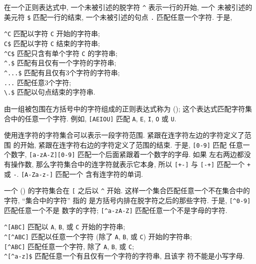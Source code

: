在一个正则表达式中, 一个未被引述的脱字符 \verb'^' 表示一行的开始, 一个
未被引述的美元符 \verb'$' 匹配一行的结束, 一个未被引述的句点 \verb'.'
匹配任意一个字符. 于是,
\begin{tabbing}
    \verb'^C' \hspace{4em}  \= 匹配以字符 \verb'C' 开始的字符串; \\
    \verb'C$'   \> 匹配以字符 \verb'C' 结束的字符串; \\
    \verb'^C$'  \> 匹配只含有单个字符 \verb'C' 的字符串; \\
    \verb'^.$'  \> 匹配有且仅有一个字符的字符串; \\
    \verb'^...$' \> 匹配有且仅有3个字符的字符串; \\
    \verb'...'  \> 匹配任意3个字符; \\
    \verb'\.$'  \> 匹配以句点结束的字符串.
\end{tabbing}

由一组被包围在方括号中的字符组成的正则表达式称为 
(); 这个表达式匹配字符集合中的任意一个字符. 例如,
\verb'[AEIOU]' 匹配 \verb'A', \verb'E', \verb'I', \verb'O' 或 \verb'U'.

使用连字符的字符集合可以表示一段字符范围. 紧跟在连字符左边的字符定义了范围
的开始, 紧跟在连字符右边的字符定义了范围的结束. 于是, \verb'[0-9]' 匹配
任意一个数字, \verb'[a-zA-Z][0-9]' 匹配一个后面紧跟着一个数字的字母. 如果
左右两边都没有操作数, 那么字符集合中的连字符就表示它本身, 所以 \verb'[+-]'
与 \verb'[-+]' 匹配一个 \verb'+' 或 \verb'-'. \verb'[A-Za-z-]' 匹配一个
含有连字符的单词.

一个  () 的字符集合在 \verb'[' 之后以
\verb'^' 开始. 这样一个集合匹配任意一个不在集合中的字符, ``集合中的字符''%
指的
是方括号内排在脱字符之后的那些字符. 于是, \verb'[^0-9]' 匹配任意一个不是
数字的字符; \verb'[^a-zA-Z]' 匹配任意一个不是字母的字符.
\begin{tabbing}
    \verb'^[ABC]' \hspace{4em}  \= 匹配以 \verb'A', \verb'B', 或 \verb'C'
        开始的字符串; \\
    \verb'^[^ABC]' \> 匹配以任意一个字符 (除了 \verb'A', \verb'B',
        或 \verb'C') 开始的字符串; \\
    \verb'[^ABC]' \> 匹配任意一个字符, 除了 \verb'A', \verb'B', 或
        \verb'C'; \\
    \verb'^[^a-z]$' \> 匹配任意一个有且仅有一个字符的字符串, 且该字
        符不能是小写字母.
\end{tabbing}

